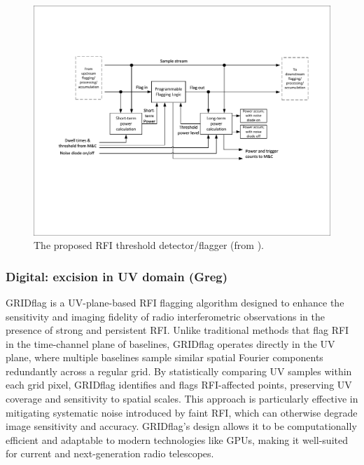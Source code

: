 \begin{figure}
    \centering
    \includegraphics[height=.28\textheight]{figures/RFI_DF_SKA_Mid_CBF.pdf}
    \caption{The proposed RFI threshold detector/flagger (from \cite{ska_mid_cbf_rfi_2019}).}
    \label{fig:rfi_df_ska_mid_cbf}
\end{figure}


\subsubsection{Digital: excision in UV domain (Greg)}

GRIDflag \cite{10464448} is a UV-plane-based RFI flagging algorithm designed to enhance the sensitivity and imaging fidelity of radio interferometric observations in the presence of strong and persistent RFI. Unlike traditional methods that flag RFI in the time-channel plane of baselines, GRIDflag operates directly in the UV plane, where multiple baselines sample similar spatial Fourier components redundantly across a regular grid. By statistically comparing UV samples within each grid pixel, GRIDflag identifies and flags RFI-affected points, preserving UV coverage and sensitivity to spatial scales. This approach is particularly effective in mitigating systematic noise introduced by faint RFI, which can otherwise degrade image sensitivity and accuracy. GRIDflag's design allows it to be computationally efficient and adaptable to modern technologies like GPUs, making it well-suited for current and next-generation radio telescopes.

